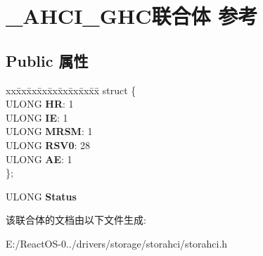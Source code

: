 \hypertarget{union___a_h_c_i___g_h_c}{}\section{\+\_\+\+A\+H\+C\+I\+\_\+\+G\+H\+C联合体 参考}
\label{union___a_h_c_i___g_h_c}
\subsection*{Public 属性}
\begin{DoxyCompactItemize}
\item 
\mbox{\label{union___a_h_c_i___g_h_c_a509f08e1edcbe2c1e3f9bd22f03a8b08}} 
\begin{tabbing}
xx\=xx\=xx\=xx\=xx\=xx\=xx\=xx\=xx\=\kill
struct \{\\
\>ULONG {\bfseries HR}: 1\\
\>ULONG {\bfseries IE}: 1\\
\>ULONG {\bfseries MRSM}: 1\\
\>ULONG {\bfseries RSV0}: 28\\
\>ULONG {\bfseries AE}: 1\\
\}; \\

\end{tabbing}\item 
\mbox{\label{union___a_h_c_i___g_h_c_a0d05b785402371cfbc1470fa3c7df08b}} 
U\+L\+O\+NG {\bfseries Status}
\end{DoxyCompactItemize}


该联合体的文档由以下文件生成\+:\begin{DoxyCompactItemize}
\item 
E\+:/\+React\+O\+S-\/0../drivers/storage/storahci/storahci.\+h\end{DoxyCompactItemize}
